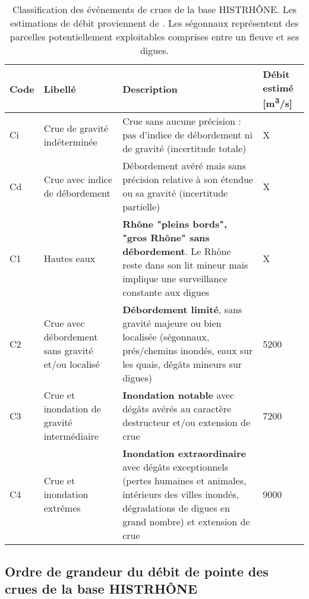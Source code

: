\documentclass[11pt]{article}
\begin{document}
\begin{table}[h]
	\centering
	\caption{Classification des événements de crues de la base HISTRHÔNE. Les estimations de débit proviennent de \citet{pichard_hydro-climatology_2017}. Les ségonnaux représentent des parcelles potentiellement exploitables comprises entre un fleuve et ses digues.}
	\label{tab:CatCrueHistrhone}
		\begin{tabular}{|m{0.8cm}|m{3.6cm}|m{7.5cm}|m{3.4cm}|}
		\hline
		Code &
		  Libellé &
		  Description &
		  Débit estimé [m\textsuperscript{3}/s] \\ \hline
		Ci &
		  Crue de gravité indéterminée &
		  Crue sans aucune précision : pas d'indice de débordement ni de gravité (incertitude totale) &
		  X \\ \hline
		Cd &
		  Crue avec indice de débordement &
		  Débordement avéré mais sans précision relative à son étendue ou sa gravité (incertitude partielle) &
		  X \\ \hline
		C1 &
		  Hautes eaux &
		  
\textbf{Rhône "pleins bords", "gros Rhône" sans débordement}. Le Rhône reste dans son lit mineur mais implique une surveillance constante aux digues &
		  X \\ \hline
		C2 &
		  Crue avec débordement sans gravité et/ou localisé &
		 
\textbf{Débordement limité}, sans gravité majeure ou bien localisée (ségonnaux, prés/chemins inondés, eaux sur les quais, dégâts mineurs sur digues) &
		 5200 \\ \hline
		C3 &
		  Crue et inondation de gravité intermédiaire &
		  
\textbf{Inondation notable} avec dégâts avérés au caractère destructeur et/ou extension de crue &
		  7200 \\ \hline
		C4 &
		  Crue et inondation extrêmes &
\textbf{Inondation extraordinaire} avec dégâts exceptionnels (pertes humaines et animales, intérieurs des villes inondés, dégradations de digues en grand nombre) et extension de crue &
		  9000 \\ \hline
		\end{tabular}
\end{table}
	
\FloatBarrier

	\subsection{Ordre de grandeur du débit de pointe des crues de la base HISTRHÔNE}
	
\end{document}
